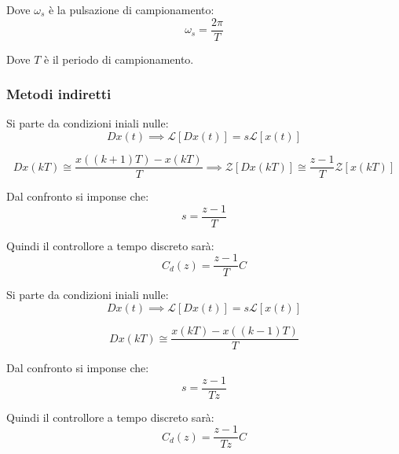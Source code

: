 Dove $\omega_s$ è la pulsazione di campionamento:
\begin{equation}
  \omega_s = \frac{2 \pi}{T}
\end{equation}

Dove $T$ è il periodo di campionamento.

\subsubsection{Metodi indiretti}
\begin{definition}
  Si parte da condizioni iniali nulle:
  \begin{equation}
    Dx(t) \implies \mathcal{L}[Dx(t)] = s \mathcal{L} [x(t)]
  \end{equation}

  \begin{equation}
    Dx(kT) \cong \frac{x((k+1)T) - x(kT)}{T} \implies \mathcal{Z}[Dx(kT)] \cong \frac{z-1}{T} \mathcal{Z}[x(kT)]
  \end{equation}

  Dal confronto si imponse che:
  \begin{equation}
    s = \frac{z-1}{T}
  \end{equation}

  Quindi il controllore a tempo discreto sarà:
  \begin{equation}
    C_d(z) = \frac{z-1}{T} C
  \end{equation}
\end{definition}

\begin{definition}
  Si parte da condizioni iniali nulle:
  \begin{equation}
    Dx(t) \implies \mathcal{L}[Dx(t)] = s \mathcal{L} [x(t)]
  \end{equation}

  \begin{equation}
    Dx(kT) \cong \frac{x(kT) - x((k-1)T)}{T}
  \end{equation}

  Dal confronto si imponse che:
  \begin{equation}
    s = \frac{z-1}{Tz}
  \end{equation}

  Quindi il controllore a tempo discreto sarà:
  \begin{equation}
    C_d(z) = \frac{z-1}{Tz} C
  \end{equation}
\end{definition}

